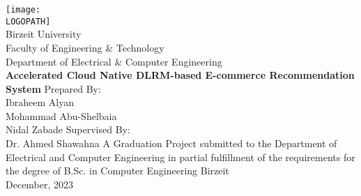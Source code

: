 \documentclass[12pt,a4paper]{report}
\def \LOGOPATH {assets/birzeit-logo.png}
\def \UNIVERSITY {Birzeit University}
\def \FACULTY {Faculty of Engineering \& Technology}
\def \DEPARTEMENT {Department of Electrical \& Computer Engineering}
\def \PROJECTTITLE {Accelerated Cloud Native DLRM-based E-commerce Recommendation System}
\def \STUDENTA {Ibraheem Alyan}
\def \STUDENTB {Mohammad Abu-Shelbaia}
\def \STUDENTC {Nidal Zabade}
\def \SUPERVISOR {Dr. Ahmed Shawahna}
\begin{document}
\setlength{\parindent}{0em}
\setlength{\parskip}{0.5em}


\begin{titlepage}
    \vfill
    \begin{center}
        \texttt{[image: \\LOGOPATH]} \\
        \fontsize{14pt}{14pt}\selectfont
        \vfill
        \UNIVERSITY \\
        \FACULTY \\
        \DEPARTEMENT \\
        \vfill
        \fontsize{17.28pt}{17.28pt}\selectfont
        \textbf{\PROJECTTITLE}
        \vfill
        \fontsize{14pt}{14pt}\selectfont
        Prepared By: \\
        \STUDENTA \\
        \STUDENTB \\
        \STUDENTC
        \vfill
        Supervised By: \\
        \SUPERVISOR
        \vfill
        A Graduation Project submitted to the Department of Electrical and Computer Engineering in partial fulfillment of the requirements for the degree of B.Sc. in Computer Engineering
        \vfill
        Birzeit \\
        December, 2023
    \end{center}
\end{titlepage}

\dominitoc



\cleardoublepage {} {} \mtcaddchapter \tableofcontents

\cleardoublepage {} {} \mtcaddchapter \listoftables

\cleardoublepage {} {} \mtcaddchapter \listoffigures

\cleardoublepage

\setlength{\parindent}{0em}
\setlength{\parskip}{0.5em}














\cleardoublepage {} {} \mtcaddchapter


\end{document}
